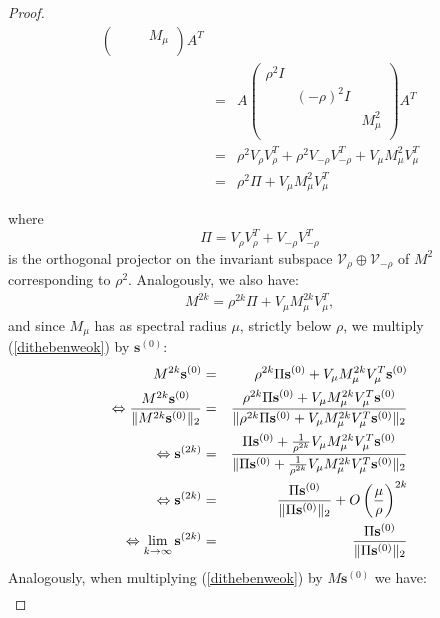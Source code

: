 \documentclass[a4paper,11pt]{report}
\begin{document}
\begin{proof}
\begin{eqnarray*}
\begin{pmatrix}
\; & \; & M_\mu \\
\end{pmatrix}A^T\\
&=& A \begin{pmatrix}
\rho^2 I & \; & \; \\
\; & (-\rho)^2 I & \;\\
\; & \; & M^2_\mu \\
\end{pmatrix}A^T\\
&=& \rho^2 V_\rho V^T_\rho + \rho^2 V_{-\rho}V^T_{-\rho} + V_{\mu}M^2_{\mu}V_{\mu}^T\\
   &=& \rho^2 \Pi + V_\mu M^2_\mu V_\mu^T
\end{eqnarray*}

where
$$\Pi = V_\rho V_\rho^T + V_{-\rho}V_{-\rho}^T$$
 is the orthogonal projector on the invariant subspace $\mathcal{V}_\rho \oplus \mathcal{V}_{-\rho}$
 of $M^2$ corresponding to $\rho^2$. Analogously, we also have:
 \begin{eqnarray}\label{dithebenweok}
  M^{2k} = \rho^{2k}\Pi + V_\mu M^{2k}_\mu V_\mu^T,
\end{eqnarray}
 and since $M_\mu$ has as spectral radius $\mu$, strictly below $\rho$, we multiply (\ref{dithebenweok}) by 
 $\mathbf{s}^{(0)}$:
 \allowdisplaybreaks
 \begin{eqnarray}
   M^{2k}\mathbf{s}^{(0)} &=& \rho^{2k}\Pi\mathbf{s}^{(0)} + V_\mu M^{2k}_\mu 
   V_\mu^T\mathbf{s}^{(0)} \notag\\
  \Leftrightarrow \frac{M^{2k}\mathbf{s}^{(0)}}{\|M^{2k}\mathbf{s}^{(0)}\|_2}  &=&\frac{\rho^{2k}\Pi\mathbf{s}^{(0)} + V_\mu M^{2k}_\mu  V_\mu^T\mathbf{s}^{(0)}}{\|\rho^{2k}\Pi\mathbf{s}^{(0)} + V_\mu M^{2k}_\mu  V_\mu^T\mathbf{s}^{(0)}\|_2}\notag\\
    \Leftrightarrow \mathbf{s}^{(2k)}  &=&\frac{\Pi\mathbf{s}^{(0)} + \frac{1}{\rho^{2k}}V_\mu M^{2k}_\mu  V_\mu^T\mathbf{s}^{(0)}}{\|\Pi\mathbf{s}^{(0)} +  \frac{1}{\rho^{2k}}V_\mu M^{2k}_\mu  V_\mu^T\mathbf{s}^{(0)}\|_2}\notag\\
  \Leftrightarrow \mathbf{s}^{(2k)}  &=& \frac{\Pi\mathbf{s}^{(0)}}{\|\Pi\mathbf{s}^{(0)}\|_2}  + O\left(\frac{\mu}{\rho}\right)^{2k} \label{vergeejkjfqk}\\
\Leftrightarrow  \lim_{k \to \infty} \mathbf{s}^{(2k)}  &=& 
\frac{\Pi\mathbf{s}^{(0)}}{\|\Pi\mathbf{s}^{(0)}\|_2}\label{gat1}
\end{eqnarray}
Analogously, when multiplying (\ref{dithebenweok}) by $M\mathbf{s}^{(0)}$ we 
have:
 \begin{eqnarray}

\end{eqnarray}
\end{proof}
\end{document}
